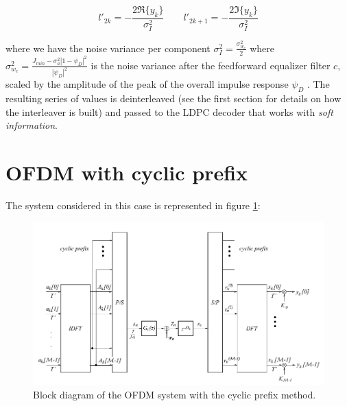 \documentclass[a4paper,11.5pt]{article}
\begin{document}
\begin{equation}
l'_{2k} =- \frac{2 \Re\{y_k\}}{\sigma_{I}^2} \quad \quad
l'_{2k+1}= - \frac{2 \Im\{y_k\}}{\sigma_{I}^2}
\end{equation}

where we have the noise variance per component $\sigma_I^2=\frac{\sigma_{w_c}^2}{2}$ where  $\sigma_{w_c}^2 = \frac{J_{min}-\sigma_a^2 |1-\psi_D|^2}{|\psi_D|^2}$ is the noise variance after the feedforward equalizer filter $c$, scaled by the amplitude of the peak of the overall impulse response $\psi_D$ . The resulting series of values is deinterleaved (see the first section for details on how the interleaver is built) and passed to the LDPC decoder that works with \emph{soft information}.

\section*{OFDM with cyclic prefix}

The system considered in this case is represented in figure \ref{fig:ofdm_schema}:
 
\begin{figure}[H]
	\begin{center}   
		\includegraphics[width=\textwidth]{figs/OFDM_schema.png} 
		\caption{Block diagram of the OFDM system with the cyclic prefix method.}
		\label{fig:ofdm_schema}
	\end{center}
\end{figure}
\end{document}
